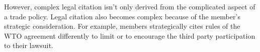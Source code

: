 However, complex legal citation isn't only derived from the complicated aspect of a trade policy.
Legal citation also becomes complex because of the member's strategic consideration. For example,
members strategically cites rules of the WTO agreement differently to limit or to encourage 
the third party participation to their lawsuit.
